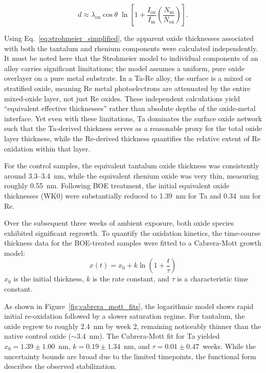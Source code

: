 \documentclass[12pt]{article}
\begin{document}
\begin{equation}
d \approx \lambda_{\mathrm{ox}} \cos\theta \;
\ln\!\left[
1 + \frac{I_{\mathrm{ox}}}{I_{\mathrm{m}}}
\left(\frac{N_{\mathrm{m}}}{N_{\mathrm{ox}}}\right)
\right].
\label{eq:strohmeier_simplified}
\end{equation}

Using Eq.~\ref{eq:strohmeier_simplified}, the apparent oxide thicknesses associated with both the tantalum and rhenium components were calculated independently. It must be noted here that the Strohmeier model to individual components of an alloy carries significant limitations; the model assumes a uniform, pure oxide overlayer on a pure metal substrate. In a Ta-Re alloy, the surface is a mixed or stratified oxide, meaning Re metal photoelectrons are attenuated by the entire mixed-oxide layer, not just Re oxides. These independent calculations yield ``equivalent effective thicknesses'' rather than absolute depths of the oxide-metal interface. Yet even with these limitations, Ta dominates the surface oxide network such that the Ta-derived thickness serves as a reasonable proxy for the total oxide layer thickness, while the Re-derived thickness quantifies the relative extent of Re oxidation within that layer.

For the control samples, the equivalent tantalum oxide thickness was consistently around 3.3--3.4~nm, while the equivalent rhenium oxide was very thin, measuring roughly 0.55~nm. Following BOE treatment, the initial equivalent oxide thicknesses (WK0) were substantially reduced to 1.39~nm for Ta and 0.34~nm for Re. 

Over the subsequent three weeks of ambient exposure, both oxide species exhibited significant regrowth. To quantify the oxidation kinetics, the time-course thickness data for the BOE-treated samples were fitted to a Cabrera-Mott growth model:
\begin{equation}
x(t) = x_0 + k \ln\left(1 + \frac{t}{\tau}\right)
\label{eq:cabrera_mott}
\end{equation}
$x_0$ is the initial thickness, $k$ is the rate constant, and $\tau$ is a characteristic time constant. 

As shown in Figure~\ref{fig:cabrera_mott_fits}, the logarithmic model shows rapid initial re-oxidation followed by a slower saturation regime. For tantalum, the oxide regrew to roughly 2.4~nm by week 2, remaining noticeably thinner than the native control oxide ($\sim$3.4~nm). The Cabrera-Mott fit for Ta yielded $x_0 = 1.39 \pm 1.00$~nm, $k = 0.19 \pm 1.34$~nm, and $\tau = 0.01 \pm 0.47$~weeks. While the uncertainty bounds are broad due to the limited timepoints, the functional form describes the observed stabilization.
\end{document}
